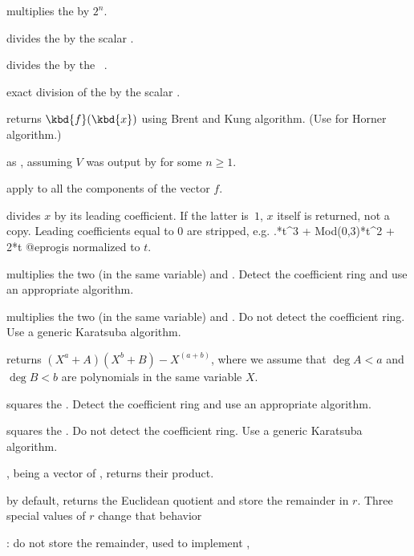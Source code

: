 multiplies the  
by $2^n$.

 divides the  
by the scalar .

 divides the  
by the ~.

 exact division of the 
 by the scalar .

 returns $\kbd{f}(\kbd{x})$ using
Brent and Kung algorithm. (Use  for Horner algorithm.)

 as ,
assuming $V$ was output by  for some $n\geq 1$.

 apply 
to all the components of the vector $f$.

 divides $x$ by its
leading coefficient. If the latter is~$1$, $x$ itself is returned, not a
copy. Leading coefficients equal to $0$ are stripped, e.g.
.*t^3 + Mod(0,3)*t^2 + 2*t
@eprog\noindent is normalized to $t$.

 multiplies the two  (in the same
variable)  and . Detect the coefficient ring and use an
appropriate algorithm.

 multiplies the two  (in the same
variable)  and . Do not detect the coefficient ring.
Use a generic Karatsuba algorithm.

returns $(X^a + A)(X^b + B) - X^(a+b)$, where we assume that $\deg A < a$
and $\deg B < b$ are polynomials in the same variable $X$.

 squares the  . Detect the coefficient
ring and use an appropriate algorithm.

 squares the  . Do not detect the
coefficient ring.  Use a generic Karatsuba algorithm.

,  being a vector of ,
returns their product.

 by default, returns the Euclidean
quotient and store the remainder in $r$. Three special values of $r$ change
that behavior
\item {}: do not store the remainder, used to implement ,

